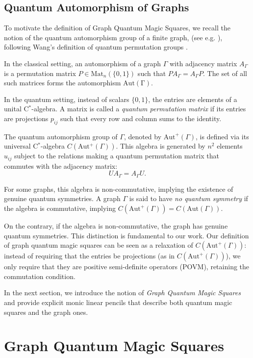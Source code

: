 \documentclass[11pt, a4paper]{article}
\theoremstyle{plain}
\theoremstyle{definition}
\theoremstyle{remark}
\begin{document}
\subsection{Quantum Automorphism of Graphs}\label{sec:QAutGamma}

To motivate the definition of Graph Quantum Magic Squares, we recall the notion of the quantum automorphism group of a finite graph, (see e.g. \cite{Ban05}), following Wang's definition of quantum permutation groups \cite{Wan95}.

In the classical setting, an automorphism of a graph \(\Gamma\)
with adjacency matrix \(A_\Gamma\)
is a permutation matrix \(P\in \mathrm{Mat}_n(\{0,1\})\)
such that \(PA_\Gamma=A_\Gamma P\). The set of all such matrices forms the automorphism  \(\mathrm{Aut(\Gamma)}\).


In the quantum setting, instead of scalars
\(\{0,1\}\), the entries
are elements of a unital
C\(^*\)-algebra. A matrix
is called a \emph{quantum permutation matrix} if its entries are projections \(p_{ij}\) such that every row and column sums to the identity.


The quantum automorphism group of \(\Gamma\), denoted by
\(\mathrm{Aut}^+(\Gamma)\), is defined via its universal
C\(^*\)-algebra \(C(\mathrm{Aut^+}(\Gamma))\). This algebra is generated by \(n^2\) elements \(u_{ij}\) subject to the relations making a quantum permutation matrix that commutes with the adjacency matrix:
    \[ U A_\Gamma = A_\Gamma U. \] 
    
For some graphs, this algebra is non-commutative, implying the existence of genuine quantum symmetries. A graph \(\Gamma\) is said to have \emph{no quantum symmetry} if the algebra
is commutative, implying \(C(\mathrm{Aut}^+(\Gamma))=C(\mathrm{Aut}(\Gamma))\).

On the contrary, if the algebra is non-commutative, the graph has genuine quantum symmetries.
This distinction is fundamental to our work. Our definition of graph quantum magic squares can be seen as a relaxation of \(C(\mathrm{Aut}^+(\Gamma))\): instead of requiring that the entries be projections (as in \(C(\mathrm{Aut}^+(\Gamma))\)), we only require that they are positive semi-definite operators (POVM), retaining the commutation condition.


In the next section, we introduce the notion of \emph{Graph Quantum Magic Squares} and provide explicit
monic linear pencils that describe both quantum magic squares
and the graph ones.

\section{Graph Quantum Magic Squares}
\end{document}
